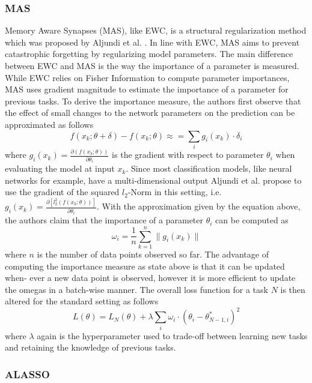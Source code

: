 \subsubsection{MAS}
Memory Aware Synapses (MAS), like EWC, is a structural regularization method which was proposed by Aljundi et al. \cite{aljundi2018memory}. In line with
EWC, MAS aims to prevent catastrophic forgetting by regularizing model parameters. The main difference between EWC and MAS is the way the importance of
a parameter is measured. While EWC relies on Fisher Information to compute parameter importances, MAS uses gradient magnitude to estimate the importance
of a parameter for previous tasks. To derive the importance measure, the authors first observe that the effect of small changes to the network parameters
on the prediction can be approximated as follows
\begin{equation}
    f(x_k; \theta + \delta) - f(x_k; \theta) \approx = \sum_i g_i(x_k) \cdot \delta_i
\end{equation}
where $g_i(x_k) = \frac{\partial(f(x_k;\theta))}{\partial \theta_i}$  is the gradient with respect to parameter $\theta_i$ when evaluating the model at
input $x_k$. Since most classification models, like neural networks for example, have a multi-dimensional output Aljundi et al. propose to use the gradient
of the squared $l_2$-Norm in this setting, i.e. $g_i(x_k) =  \frac{\partial[l^2_2(f(x_k;\theta))]}{\partial \theta_i}$. With the approximation given by the
equation above, the authors claim that the importance of a parameter $\theta_i$ can be computed as
\begin{equation}
    \omega_i = \frac{1}{n} \sum_{k=1}^n \lVert g_i(x_k) \rVert
\end{equation}
where $n$ is the number of data points observed so far. The advantage of computing the importance measure as state above is that it can be updated when-
ever a new data point is observed, however it is more efficient to update the omegas in a batch-wise manner. The overall loss function for a task $N$ is
then altered for the standard setting as follows
\begin{equation}
    L(\theta) = L_N(\theta) + \lambda \sum_i \omega_i \cdot (\theta_i - \theta^*_{N-1,i})^2
\end{equation}
where $\lambda$ again is the hyperparameter used to trade-off between learning new tasks and retaining the knowledge of previous tasks.
\subsubsection{ALASSO}

